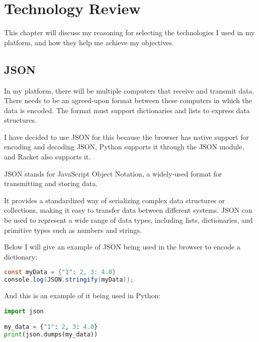 \chapter{Technology Review}


This chapter will discuss my reasoning for selecting the technologies I used
in my platform, and how they help me achieve my objectives.

\section{JSON}
In my platform, there will be multiple computers that receive and transmit data.
There needs to be an agreed-upon format between these computers in which the data is encoded.
The format must support dictionaries and lists to express data structures.

I have decided to use JSON for this because the browser has
native support for encoding and decoding JSON,
Python supports it through the JSON module, and Racket also supports it.

JSON stands for JavaScript Object Notation,
a widely-used format for transmitting and storing data.

It provides a standardized way of serializing complex data structures or collections,
making it easy to transfer data between different systems.
JSON can be used to represent a wide range of data types,
including lists, dictionaries, and primitive types such as numbers and strings. \cite{ECMA-404}

Below I will give an example of JSON being used in the browser to encode a dictionary:

\begin{lstlisting}[language=Java]
const myData = {"1": 2, 3: 4.0}
console.log(JSON.stringify(myData));
\end{lstlisting}

And this is an example of it being used in Python:

\begin{lstlisting}[language=Python]
import json

my_data = {"1": 2, 3: 4.0}
print(json.dumps(my_data))
\end{lstlisting}

